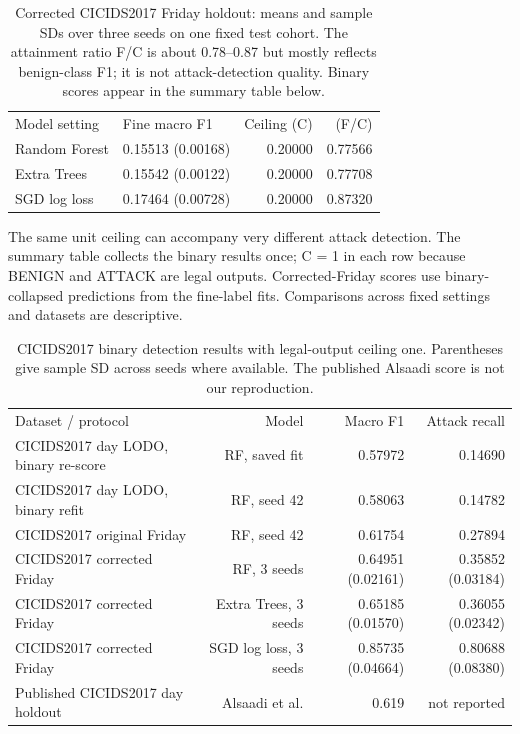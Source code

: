 \documentclass[journal]{IEEEtran}
\begin{document}
\begin{table}[h]\centering
\caption{Corrected CICIDS2017 Friday holdout: means and sample SDs over three seeds on one fixed test cohort. The attainment ratio F/C is about 0.78--0.87 but mostly reflects benign-class F1; it is not attack-detection quality. Binary scores appear in the summary table below.}
\label{tab:corrected-cic}
\begin{tabular}{p{4.2cm}p{3.3cm}rr}
Model setting & Fine macro F1 & Ceiling (C) & (F/C) \\
Random Forest & 0.15513 (0.00168) & 0.20000 & 0.77566 \\
Extra Trees & 0.15542 (0.00122) & 0.20000 & 0.77708 \\
SGD log loss & 0.17464 (0.00728) & 0.20000 & 0.87320 \\
\end{tabular}\end{table}

The same unit ceiling can accompany very different attack detection. The summary table collects the binary results once; C = 1 in each row because BENIGN and ATTACK are legal outputs. Corrected-Friday scores use binary-collapsed predictions from the fine-label fits. Comparisons across fixed settings and datasets are descriptive.

\begin{table}[h]\centering
\caption{CICIDS2017 binary detection results with legal-output ceiling one. Parentheses give sample SD across seeds where available. The published Alsaadi score is not our reproduction.}
\label{tab:unit-ceiling}
\begin{tabular}{lrrr}
Dataset / protocol & Model & Macro F1 & Attack recall \\
CICIDS2017 day LODO, binary re-score & RF, saved fit & 0.57972 & 0.14690 \\
CICIDS2017 day LODO, binary refit & RF, seed 42 & 0.58063 & 0.14782 \\
CICIDS2017 original Friday & RF, seed 42 & 0.61754 & 0.27894 \\
CICIDS2017 corrected Friday & RF, 3 seeds & 0.64951 (0.02161) & 0.35852 (0.03184) \\
CICIDS2017 corrected Friday & Extra Trees, 3 seeds & 0.65185 (0.01570) & 0.36055 (0.02342) \\
CICIDS2017 corrected Friday & SGD log loss, 3 seeds & 0.85735 (0.04664) & 0.80688 (0.08380) \\
Published CICIDS2017 day holdout & Alsaadi et al. \cite{alsaadi2026binary} & 0.619 & not reported \\
\end{tabular}\end{table}
\end{document}
